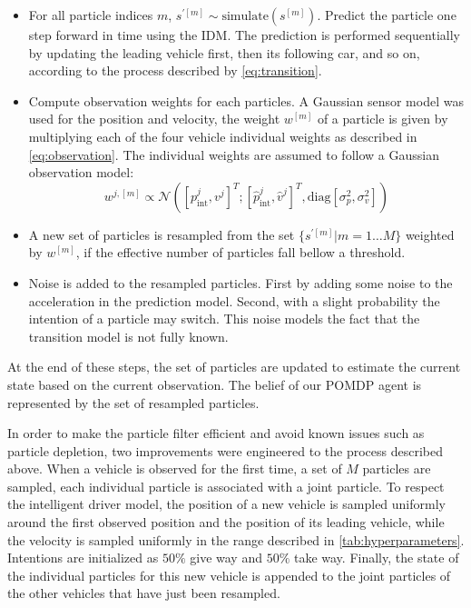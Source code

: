 	\begin{itemize}
		\item For all particle indices $m$, $s^{\prime[m]}\sim\text{simulate}(s^{[m]})$. Predict the particle one step forward in time using the IDM. The prediction is performed sequentially by updating the leading vehicle first, then its following car, and so on, according to the process described by \eqref{eq:transition}.
		\item Compute observation weights for each particles. A Gaussian sensor model was used for the position and velocity, the weight $w^{[m]}$ of a particle is given by multiplying each of the four vehicle individual weights as described in \eqref{eq:observation}. The individual weights are assumed to follow a Gaussian observation model: 
		\begin{equation}
			w^{j,[m]} \propto \mathcal{N}([p^j_{\text{int}}, v^j]^T ; [\hat{p}^j_\text{int}, \hat{v}^j]^T, \mathrm{diag}[\sigma_p^2, \sigma_v^2])
		\end{equation}
		\item A new set of particles is resampled from the set $\{s^{\prime[m]} | m=1\ldots M\}$ weighted by $w^{[m]}$, if the effective number of particles fall bellow a threshold. 
		\item Noise is added to the resampled particles. First by adding some noise to the acceleration in the prediction model. Second, with a slight probability the intention of a particle may switch. This noise models the fact that the transition model is not fully known. 
	\end{itemize}
	At the end of these steps, the set of particles are updated to estimate the current state based on the current observation. The belief of our POMDP agent is represented by the set of resampled particles. 
	
	In order to make the particle filter efficient and avoid known issues such as particle depletion, two improvements were engineered to the process described above. 
	When a vehicle is observed for the first time, a set of $M$ particles are sampled, each individual particle is associated with a joint particle. To respect the intelligent driver model, the position of a new vehicle is sampled uniformly around the first observed position and the position of its leading vehicle, while the velocity is sampled uniformly in the range described in \ref{tab:hyperparameters}. 
	Intentions are initialized as $50\%$ give way and $50\%$ take way. Finally, the state of the individual particles for this new vehicle is appended to the joint particles of the other vehicles that have just been resampled. 
	

